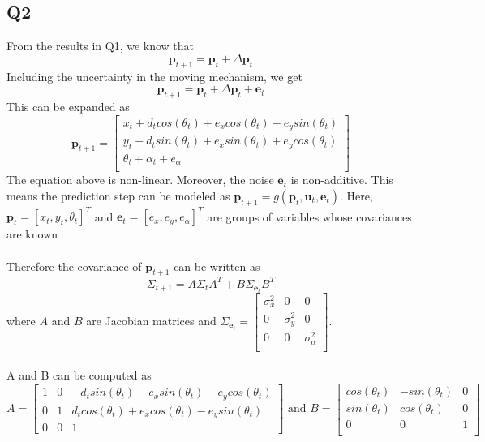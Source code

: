 \documentclass[12pt, a4paper]{article}
\begin{document}
\subsection{Q2}
From the results in Q1, we know that
\[\mathbf{p}_{t+1} = \mathbf{p}_{t} + \Delta \mathbf{p}_t\]
Including the uncertainty in the moving mechanism, we get
\[\mathbf{p}_{t+1} = \mathbf{p}_{t} + \Delta \mathbf{p}_t + \mathbf{e}_t\]
This can be expanded as
\[\mathbf{p}_{t+1} = \begin{bmatrix}
  x_t + d_tcos(\theta_t) + e_xcos(\theta_t) - e_ysin(\theta_t)\\
  y_t + d_tsin(\theta_t) + e_xsin(\theta_t) + e_ycos(\theta_t)\\
  \theta_t + \alpha_t + e_{\alpha}\\
\end{bmatrix}\]
The equation above is non-linear. Moreover, the noise $\mathbf{e}_t$ is non-additive. This means the prediction step can be modeled as $\mathbf{p}_{t+1} = g(\mathbf{p}_t, \mathbf{u}_t, \mathbf{e}_t)$. Here, $\mathbf{p}_t = [x_t, y_t, \theta_t]^T$ and $\mathbf{e}_t = [e_x, e_y, e_{\alpha}]^T$ are groups of variables whose covariances are known\\\\
Therefore the covariance of $\mathbf{p}_{t+1}$ can be written as 
\begin{equation}
  \label{q2_1}
\Sigma_{t+1} = A\Sigma_tA^T + B\Sigma_{\mathbf{e}_t}B^T
\end{equation}
where $A$ and $B$ are Jacobian matrices and $\Sigma_{\mathbf{e}_t}=\begin{bmatrix}
  \sigma_x^2 & 0 & 0\\
  0 & \sigma_y^2 & 0\\
  0  & 0 & \sigma_{\alpha}^2\\
\end{bmatrix}$.\\\\
A and B can be computed as 
\[A = \begin{bmatrix}
  1 & 0 & -d_tsin(\theta_t)-e_xsin(\theta_t) - e_ycos(\theta_t)\\
  0 & 1 & d_tcos(\theta_t)+e_xcos(\theta_t)-e_ysin(\theta_t)\\
  0 & 0 & 1
\end{bmatrix} \text{ and } B = \begin{bmatrix}
  cos(\theta_t) & -sin(\theta_t) & 0\\
  sin(\theta_t) & cos(\theta_t) & 0\\
  0  & 0 & 1\\
\end{bmatrix}\]
\end{document}
